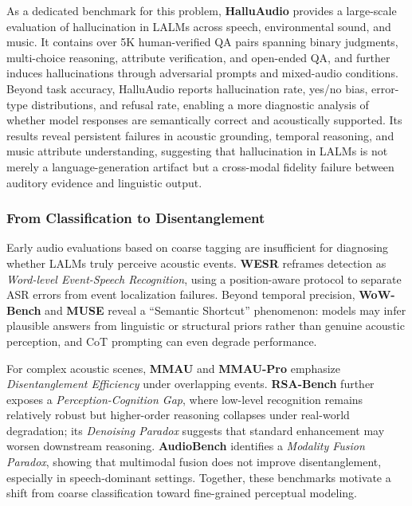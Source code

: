 As a dedicated benchmark for this problem, \textbf{HalluAudio} \cite{zhao2026halluaudiocomprehensivebenchmarkhallucination} provides a large-scale evaluation of hallucination in LALMs across speech, environmental sound, and music. It contains over 5K human-verified QA pairs spanning binary judgments, multi-choice reasoning, attribute verification, and open-ended QA, and further induces hallucinations through adversarial prompts and mixed-audio conditions. Beyond task accuracy, HalluAudio reports hallucination rate, yes/no bias, error-type distributions, and refusal rate, enabling a more diagnostic analysis of whether model responses are semantically correct and acoustically supported. Its results reveal persistent failures in acoustic grounding, temporal reasoning, and music attribute understanding, suggesting that hallucination in LALMs is not merely a language-generation artifact but a cross-modal fidelity failure between auditory evidence and linguistic output.

\subsubsection{From Classification to Disentanglement}
\label{sec:5.1.1}
Early audio evaluations based on coarse tagging are insufficient for diagnosing whether LALMs truly perceive acoustic events. \textbf{WESR} \cite{yang2026wesr} reframes detection as \textit{Word-level Event-Speech Recognition}, using a position-aware protocol to separate ASR errors from event localization failures. Beyond temporal precision, \textbf{WoW-Bench} \cite{kim2025wow} and \textbf{MUSE} \cite{carone2025muse} reveal a ``Semantic Shortcut'' phenomenon: models may infer plausible answers from linguistic or structural priors rather than genuine acoustic perception, and CoT prompting can even degrade performance.

For complex acoustic scenes, \textbf{MMAU} \cite{sakshi2024mmau} and \textbf{MMAU-Pro} \cite{kumar2025mmau} emphasize \textit{Disentanglement Efficiency} under overlapping events. \textbf{RSA-Bench} \cite{zhang2026rsa} further exposes a \textit{Perception-Cognition Gap}, where low-level recognition remains relatively robust but higher-order reasoning collapses under real-world degradation; its \textit{Denoising Paradox} suggests that standard enhancement may worsen downstream reasoning. \textbf{AudioBench} \cite{wang2025audiobench} identifies a \textit{Modality Fusion Paradox}, showing that multimodal fusion does not improve disentanglement, especially in speech-dominant settings. Together, these benchmarks motivate a shift from coarse classification toward fine-grained perceptual modeling.

